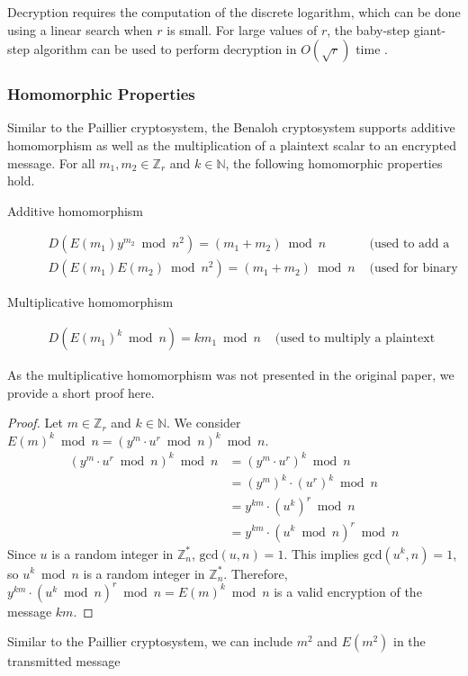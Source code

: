 Decryption requires the computation of the discrete logarithm, which can be done using a linear search when $r$ is small. For large values of $r$, the baby-step giant-step algorithm can be used to perform decryption in $O(\sqrt{r})$ time \cite{benaloh_dense_1994}.

\subsubsection{Homomorphic Properties}
Similar to the Paillier cryptosystem, the Benaloh cryptosystem supports additive homomorphism as well as the multiplication of a plaintext scalar to an encrypted message.
For all $m_1,m_2 \in \mathbb{Z}_r$ and $k\in \mathbb{N}$, the following homomorphic properties hold.
\begin{description}
  \item[Additive homomorphism]
  \begin{align*}
    D(E(m_1)y^{m_2}\bmod n^2)=(m_1+m_2)\bmod n & \text{ (used to add a constant)}\\
    D(E(m_1)E(m_2)\bmod n^2)=(m_1+m_2)\bmod n & \text{ (used for binary addition)}
  \end{align*}
  \item[Multiplicative homomorphism]
  \begin{align*}
    D(E(m_1)^k\bmod n)= km_1\bmod n & \text{ (used to multiply a plaintext constant)}
  \end{align*}
\end{description}

As the multiplicative homomorphism was not presented in the original paper, we provide a short proof here.
\begin{proof}
  Let $m \in \mathbb{Z}_r$ and $k\in \mathbb{N}$.
  We consider $E(m)^k\bmod n = (y^m \cdot u^r \bmod{n})^k\bmod n$.
  \begin{align*}
    (y^m \cdot u^r \bmod{n})^k\bmod n
    &= (y^m \cdot u^r)^k \bmod{n}\\
    &= (y^m)^k \cdot (u^r)^k \bmod{n}\\
    &= y^{km} \cdot (u^k)^r \bmod{n}\\
    &= y^{km} \cdot (u^k \bmod{n})^r \bmod{n}
  \end{align*}
  Since $u$ is a random integer in $\mathbb{Z}_n^*$, $\mathrm{gcd}(u,n)=1$.
  This implies $\mathrm{gcd}(u^k,n)=1$, so $u^k \bmod n$ is a random integer in $\mathbb{Z}_n^*$.
  Therefore, $y^{km} \cdot (u^k \bmod{n})^r \bmod{n} = E(m)^k\bmod n$ is a valid encryption of the message $km$.
\end{proof}

Similar to the Paillier cryptosystem, we can include $m^2$ and $E(m^2)$ in the transmitted message

